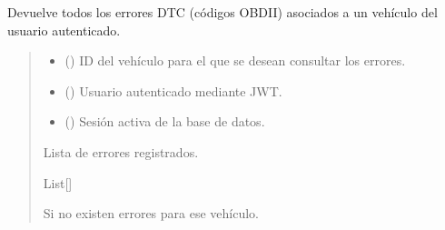 \documentclass[letterpaper,10pt,spanish]{sphinxmanual}
\begin{document}

\begin{fulllineitems}
\label{\detokenize{modelos:main.obtener_errores}}
\pysigstartsignatures
\pysiglinewithargsret
{}
{\sphinxparamcomma {}\sphinxparamcomma {}}
{}
\pysigstopsignatures
\sphinxAtStartPar
Devuelve todos los errores DTC (códigos OBD\sphinxhyphen{}II) asociados a un vehículo del usuario autenticado.
\begin{quote}\begin{description}
\begin{itemize}
\item {} 
\sphinxAtStartPar
{} () \textendash{} ID del vehículo para el que se desean consultar los errores.

\item {} 
\sphinxAtStartPar
{} ({\hyperref[\detokenize{modelos:main.Usuario}]{}}) \textendash{} Usuario autenticado mediante JWT.

\item {} 
\sphinxAtStartPar
{} () \textendash{} Sesión activa de la base de datos.

\end{itemize}

\sphinxAtStartPar
Lista de errores registrados.

\sphinxAtStartPar
List{[}{\hyperref[\detokenize{modelos:main.ErrorVehiculo}]{}}{]}

\sphinxAtStartPar
{} \textendash{} Si no existen errores para ese vehículo.

\end{description}\end{quote}

\end{fulllineitems}
\end{document}
